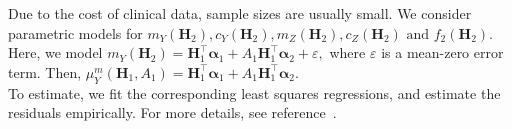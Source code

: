 \documentclass{article}
\newcommand{\itl}{\intercal}
\newcommand{\bs}{ \boldsymbol}
\begin{document}
Due to the cost of clinical data, sample sizes are usually small. We consider parametric models for $m_Y(\bs{H}_2), c_Y(\bs{H}_2), m_Z(\bs{H}_2), c_Z(\bs{H}_2)\text{ and }f_2(\bs{H}_2)$. Here, we model $m_{Y}(\bs{H}_2)=\bs{H}_1^{\itl}\bs{\alpha}_1+A_1\bs{H}^{\itl}_1\bs{\alpha}_2+\varepsilon,$ where $\varepsilon$ is a mean-zero error term. Then, $\mu_Y^m(\bs{H}_1, A_1) = \bs{H}_1^{\itl}\bs{\alpha}_1+A_1\bs{H}^{\itl}_1\bs{\alpha}_2.$\\

To estimate, we fit the corresponding least squares regressions, and estimate the residuals empirically. For more details, see reference~\cite{constrained}.
\end{document}
